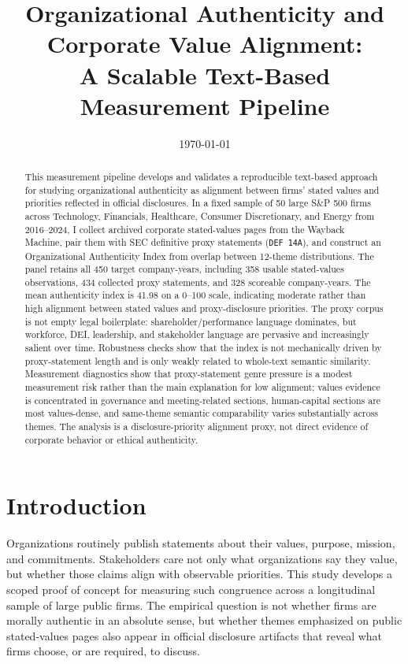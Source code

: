 \documentclass[11pt]{article}
\title{Organizational Authenticity and Corporate Value Alignment:\\
A Scalable Text-Based Measurement Pipeline}
\author{}
\date{\today}
\begin{document}
\maketitle

\begin{abstract}
This measurement pipeline develops and validates a reproducible text-based approach for studying
organizational authenticity as alignment between firms' stated values and priorities reflected in
official disclosures. In a fixed sample of 50 large S\&P 500 firms across Technology, Financials,
Healthcare, Consumer Discretionary, and Energy from 2016--2024, I collect archived corporate
stated-values pages from the Wayback Machine, pair them with SEC definitive proxy statements
(\texttt{DEF 14A}), and construct an Organizational Authenticity Index from overlap between
12-theme distributions. The panel retains all 450 target company-years, including 358 usable
stated-values observations, 434 collected proxy statements, and 328 scoreable company-years. The
mean authenticity index is 41.98 on a 0--100 scale, indicating moderate rather than high alignment
between stated values and proxy-disclosure priorities. The proxy corpus is not empty legal
boilerplate: shareholder/performance language dominates, but workforce, DEI, leadership, and
stakeholder language are pervasive and increasingly salient over time. Robustness checks show that
the index is not mechanically driven by proxy-statement length and is only weakly related to
whole-text semantic similarity. Measurement diagnostics show that proxy-statement genre pressure is
a modest measurement risk rather than the main explanation for low alignment; values evidence is
concentrated in governance and meeting-related sections, human-capital sections are most
values-dense, and same-theme semantic comparability varies substantially across themes. The analysis
is a disclosure-priority alignment proxy, not direct evidence of corporate behavior or ethical
authenticity.
\end{abstract}

\section{Introduction}

Organizations routinely publish statements about their values, purpose, mission, and commitments.
Stakeholders care not only what organizations say they value, but whether those claims align with
observable priorities. This study develops a scoped proof of concept for measuring such congruence
across a longitudinal sample of large public firms. The empirical question is not whether firms are
morally authentic in an absolute sense, but whether themes emphasized on public stated-values pages
also appear in official disclosure artifacts that reveal what firms choose, or are required, to
discuss.
\end{document}
